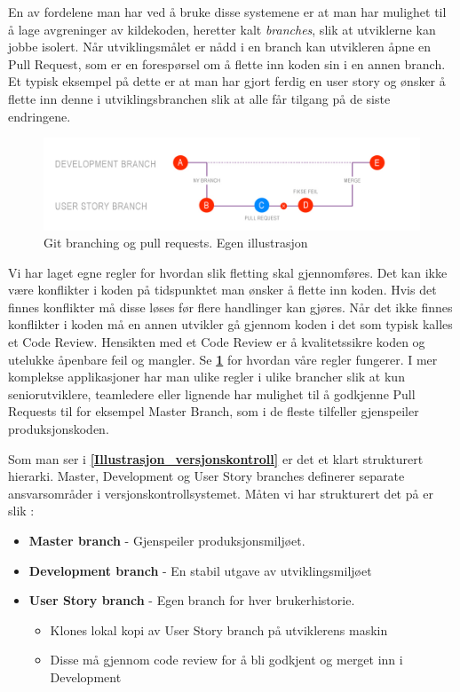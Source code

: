 En av fordelene man har ved å bruke disse systemene er at man har mulighet til å lage avgreninger av kildekoden, heretter kalt \textit{branches}, slik at utviklerne kan jobbe isolert. Når utviklingsmålet er nådd i en branch kan utvikleren åpne en Pull Request, som er en forespørsel om å flette inn koden sin i en annen branch. Et typisk eksempel på dette er at man har gjort ferdig en user story og ønsker å flette inn denne i utviklingsbranchen slik at alle får tilgang på de siste endringene.

\begin{figure}[H] 
    \centering
    \includegraphics[width=\textwidth]{figures/Tekniske-valg/Utvikling/Git.jpg}
    \caption{Git branching og pull requests. Egen illustrasjon}
    \label{Git}
\end{figure}

Vi har laget egne regler for hvordan slik fletting skal gjennomføres. Det kan ikke være konflikter i koden på tidspunktet man ønsker å flette inn koden. Hvis det finnes konflikter må disse løses før flere handlinger kan gjøres. Når det ikke finnes konflikter i koden må en annen utvikler gå gjennom koden i det som typisk kalles et Code Review. Hensikten med et Code Review er å kvalitetssikre koden og utelukke åpenbare feil og mangler. Se \textbf{\ref{Git}} for hvordan våre regler fungerer. I mer komplekse applikasjoner har man ulike regler i ulike brancher slik at kun seniorutviklere, teamledere eller lignende har mulighet til å godkjenne Pull Requests til for eksempel Master Branch, som i de fleste tilfeller gjenspeiler produksjonskoden.

Som man ser i \textbf{\ref{Illustrasjon_versjonskontroll}} er det et klart strukturert hierarki. Master, Development og User Story branches definerer separate ansvarsområder i versjonskontrollsystemet. Måten vi har strukturert det på er slik :
\begin{itemize}
  \item \textbf{Master branch} - Gjenspeiler produksjonsmiljøet.
  \item \textbf{Development branch} - En stabil utgave av utviklingsmiljøet
  \item \textbf{User Story branch} - Egen branch for hver brukerhistorie.
  \begin{itemize}
      \item Klones lokal kopi av User Story branch på utviklerens maskin
      \item Disse må gjennom code review for å bli godkjent og merget inn i Development
  \end{itemize}
\end{itemize}

